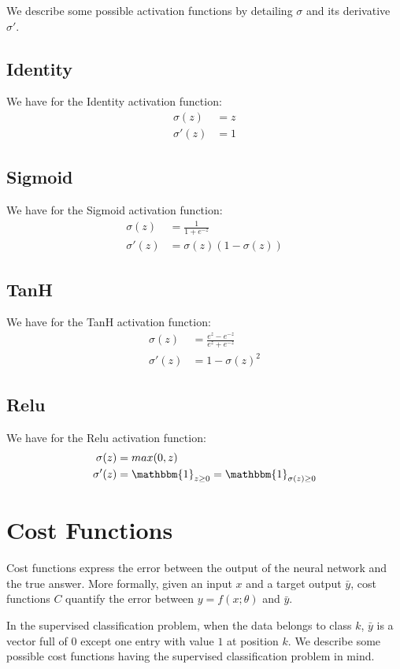 \documentclass{article} %
\begin{document}
We describe some possible activation functions by detailing $\sigma$ and its derivative $\sigma'$.

\subsection{Identity}
We have for the Identity activation function:
$$
\begin{aligned}
\sigma(z)  &= z\\
\sigma'(z) &= 1
\end{aligned}
$$

\subsection{Sigmoid}
We have for the Sigmoid activation function:
$$
\begin{aligned}
\sigma(z)  &= \frac{1}{1+e^{-z}}\\
\sigma'(z) &= \sigma(z) (1-\sigma(z))
\end{aligned}
$$

\subsection{TanH}
We have for the TanH activation function:
$$
\begin{aligned}
\sigma(z)  &=  \frac{e^z-e^{-z}}{e^z+e^{-z}}\\
\sigma'(z) &= 1-\sigma(z)^2
\end{aligned}
$$

\subsection{Relu}
We have for the Relu activation function:
$$
\begin{aligned}
\sigma(z) &=  max(0,z)\\
\sigma'(z) &= \mathbbm{1}_{z\geq 0} = \mathbbm{1}_{\sigma(z)\geq 0}
\end{aligned}
$$

\newpage
\section{Cost Functions}
Cost functions express the error between the output of the neural network and the true answer. More formally, given an input $x$ and a target output $\bar{y}$, cost functions $C$ quantify the error between $y=f(x;\theta)$ and $\bar{y}$. 

In the supervised classification problem, when the data belongs to class $k$, $\bar{y}$ is a vector full of $0$ except one entry with value $1$ at position $k$. We describe some possible cost functions having the supervised classification problem in mind.
\end{document}
